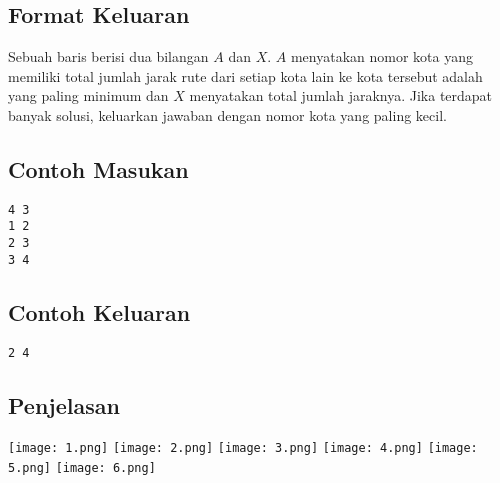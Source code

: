 \documentclass{article}
\begin{document}
\subsection*{Format Keluaran}
Sebuah baris berisi dua bilangan $A$ dan $X$. $A$ menyatakan nomor kota yang memiliki total jumlah jarak rute dari setiap kota lain ke kota tersebut adalah yang paling minimum dan $X$ menyatakan total jumlah jaraknya. Jika terdapat banyak solusi, keluarkan jawaban dengan nomor kota yang paling kecil.
\\

\begin{multicols}{2}
\subsection*{Contoh Masukan}
\begin{lstlisting}
4 3
1 2
2 3
3 4
\end{lstlisting}
\columnbreak
\subsection*{Contoh Keluaran}
\begin{lstlisting}
2 4
\end{lstlisting}
\vfill
\null
\end{multicols}

\subsection*{Penjelasan}

\texttt{[image: 1.png]}
\texttt{[image: 2.png]}
\texttt{[image: 3.png]}
\texttt{[image: 4.png]}
\texttt{[image: 5.png]}
\texttt{[image: 6.png]}


\pagebreak
\end{document}
